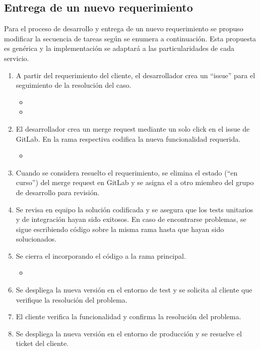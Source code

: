 \subsection{Entrega de un nuevo requerimiento}
%
Para el proceso de desarrollo y entrega de un nuevo requerimiento se
propuso modificar la secuencia de tareas según se enumera a
continuación. Esta propuesta es genérica y la implementación se
adaptará a las particularidades de cada servicio.
%
\begin{enumerate}
\item A partir del requerimiento del cliente, el desarrollador crea un
  ``issue'' para el seguimiento de la resolución del caso.
\begin{itemize}
\item {}
\item {}
\end{itemize}
\item El desarrollador crea un merge request mediante un solo click en
  el issue de GitLab. En la rama respectiva codifica la nueva
  funcionalidad requerida.
\begin{itemize}
\item {}
\end{itemize}
\item Cuando se considera resuelto el requerimiento, se elimina el
  estado  (``en curso'') del merge request en GitLab y se
  asigna el a otro miembro del grupo de desarrollo para revisión.
\item Se revisa en equipo la solución codificada y se asegura que los
  tests unitarios y de integración hayan sido exitosos. En caso de
  encontrarse problemas, se sigue escribiendo código sobre la misma
  rama hasta que hayan sido solucionados.
\item Se cierra el  incorporando el código a la
  rama principal.
\begin{itemize}
\item {}
\end{itemize}
\item Se despliega la nueva versión en el entorno de test y se
  solicita al cliente que verifique la resolución del problema.
\item El cliente verifica la funcionalidad y confirma la resolución
  del problema.
\item Se despliega la nueva versión en el entorno de producción y se
  resuelve el ticket del cliente.
\end{enumerate}
